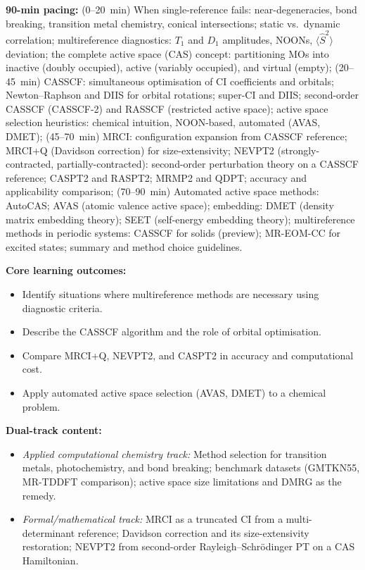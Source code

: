 \documentclass[11pt,a4paper]{article}
\begin{document}
\begin{tcolorbox}[modulebox, title={Module~II.1 --- Lecture L10: Multi-Reference Methods}]
\textbf{90-min pacing:} (0--20~min) When single-reference fails: near-degeneracies,
bond breaking, transition metal chemistry, conical intersections;
static vs.\ dynamic correlation; multireference diagnostics: $T_1$ and $D_1$ amplitudes,
NOONs, $\langle\hat{S}^2\rangle$ deviation;
the complete active space (CAS) concept: partitioning MOs into inactive (doubly occupied),
active (variably occupied), and virtual (empty);
(20--45~min) CASSCF: simultaneous optimisation of CI coefficients and orbitals;
Newton--Raphson and DIIS for orbital rotations; super-CI and DIIS;
second-order CASSCF (CASSCF-2) and RASSCF (restricted active space);
active space selection heuristics: chemical intuition, NOON-based, automated (AVAS, DMET);
(45--70~min) MRCI: configuration expansion from CASSCF reference; MRCI+Q (Davidson correction)
for size-extensivity; NEVPT2 (strongly-contracted, partially-contracted):
second-order perturbation theory on a CASSCF reference; CASPT2 and RASPT2;
MRMP2 and QDPT; accuracy and applicability comparison;
(70--90~min) Automated active space methods: AutoCAS; AVAS (atomic valence active space);
embedding: DMET (density matrix embedding theory); SEET (self-energy embedding theory);
multireference methods in periodic systems: CASSCF for solids (preview);
MR-EOM-CC for excited states; summary and method choice guidelines.

\medskip\textbf{Core learning outcomes:}
\begin{itemize}[leftmargin=1.4em,topsep=2pt,itemsep=1pt]
  \item Identify situations where multireference methods are necessary using diagnostic criteria.
  \item Describe the CASSCF algorithm and the role of orbital optimisation.
  \item Compare MRCI+Q, NEVPT2, and CASPT2 in accuracy and computational cost.
  \item Apply automated active space selection (AVAS, DMET) to a chemical problem.
\end{itemize}

\medskip\textbf{Dual-track content:}
\begin{itemize}[leftmargin=1.4em,topsep=2pt,itemsep=1pt]
  \item \textit{Applied computational chemistry track:} Method selection for transition metals,
    photochemistry, and bond breaking; benchmark datasets (GMTKN55, MR-TDDFT comparison);
    active space size limitations and DMRG as the remedy.
  \item \textit{Formal/mathematical track:} MRCI as a truncated CI from a multi-determinant
    reference; Davidson correction and its size-extensivity restoration; NEVPT2 from
    second-order Rayleigh--Schr\"odinger PT on a CAS Hamiltonian.
\end{itemize}


\end{tcolorbox}
\end{document}
